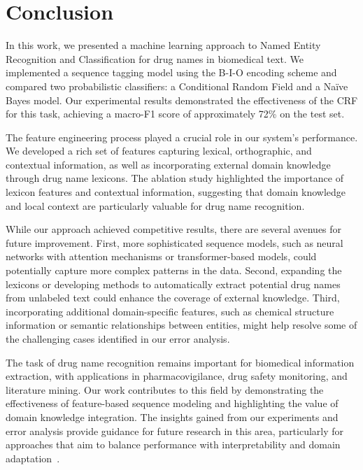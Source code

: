 \section{Conclusion}
\label{sec:conclusion}

In this work, we presented a machine learning approach to Named Entity Recognition and Classification for drug names in biomedical text. We implemented a sequence tagging model using the B-I-O encoding scheme and compared two probabilistic classifiers: a Conditional Random Field and a Naïve Bayes model. Our experimental results demonstrated the effectiveness of the CRF for this task, achieving a macro-F1 score of approximately 72\% on the test set.

The feature engineering process played a crucial role in our system's performance. We developed a rich set of features capturing lexical, orthographic, and contextual information, as well as incorporating external domain knowledge through drug name lexicons. The ablation study highlighted the importance of lexicon features and contextual information, suggesting that domain knowledge and local context are particularly valuable for drug name recognition.

While our approach achieved competitive results, there are several avenues for future improvement. First, more sophisticated sequence models, such as neural networks with attention mechanisms or transformer-based models, could potentially capture more complex patterns in the data. Second, expanding the lexicons or developing methods to automatically extract potential drug names from unlabeled text could enhance the coverage of external knowledge. Third, incorporating additional domain-specific features, such as chemical structure information or semantic relationships between entities, might help resolve some of the challenging cases identified in our error analysis.

The task of drug name recognition remains important for biomedical information extraction, with applications in pharmacovigilance, drug safety monitoring, and literature mining. Our work contributes to this field by demonstrating the effectiveness of feature-based sequence modeling and highlighting the value of domain knowledge integration. The insights gained from our experiments and error analysis provide guidance for future research in this area, particularly for approaches that aim to balance performance with interpretability and domain adaptation~\cite{ddi-lessons}.
